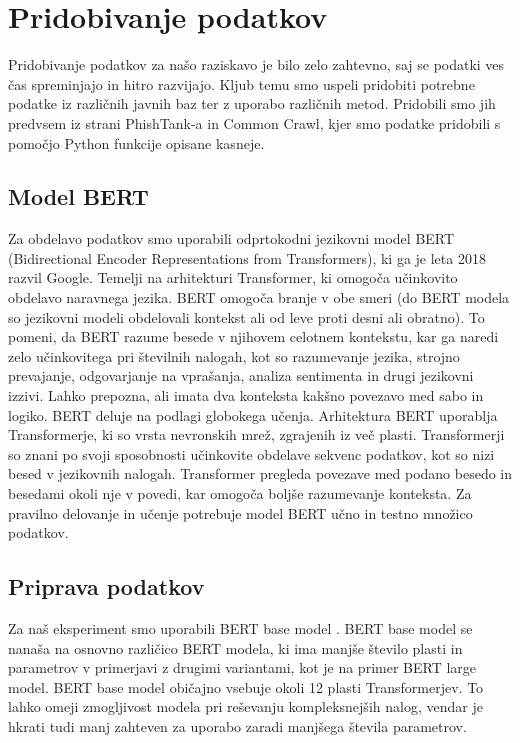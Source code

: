 \documentclass[sigconf,nonacm]{acmart}
\begin{document}
\section{Pridobivanje podatkov}
Pridobivanje podatkov za našo raziskavo je bilo zelo zahtevno, saj se podatki ves čas spreminjajo in hitro razvijajo. Kljub temu smo uspeli pridobiti potrebne podatke iz različnih javnih baz ter z uporabo različnih metod. Pridobili smo jih predvsem iz strani PhishTank-a in Common Crawl, kjer smo podatke pridobili s pomočjo Python funkcije opisane kasneje.
\subsection{Model BERT}
Za obdelavo podatkov smo uporabili odprtokodni jezikovni model BERT (Bidirectional Encoder Representations from Transformers), ki ga je leta 2018 razvil Google. Temelji na arhitekturi Transformer, ki omogoča učinkovito obdelavo naravnega jezika. BERT omogoča branje v obe smeri (do BERT modela so jezikovni modeli obdelovali kontekst ali od leve proti desni ali obratno). To pomeni, da BERT razume besede v njihovem celotnem kontekstu, kar ga naredi zelo učinkovitega pri številnih nalogah, kot so razumevanje jezika, strojno prevajanje, odgovarjanje na vprašanja, analiza sentimenta in drugi jezikovni izzivi. Lahko prepozna, ali imata dva konteksta kakšno povezavo med sabo in logiko. BERT deluje na podlagi globokega učenja. Arhitektura BERT uporablja Transformerje, ki so vrsta nevronskih mrež, zgrajenih iz več plasti. Transformerji so znani po svoji sposobnosti učinkovite obdelave sekvenc podatkov, kot so nizi besed v jezikovnih nalogah. Transformer pregleda povezave med podano besedo in besedami okoli nje v povedi, kar omogoča boljše razumevanje konteksta. Za pravilno delovanje in učenje potrebuje model BERT učno in testno množico podatkov.

\subsection{Priprava podatkov}
Za naš eksperiment smo uporabili BERT base model \cite{turc2019}. BERT base model se nanaša na osnovno različico BERT modela, ki ima manjše število plasti in parametrov v primerjavi z drugimi variantami, kot je na primer BERT large model. BERT base model običajno vsebuje okoli 12 plasti Transformerjev. To lahko omeji zmogljivost modela pri reševanju kompleksnejših nalog, vendar je hkrati tudi manj zahteven za uporabo zaradi manjšega števila parametrov.
\end{document}
